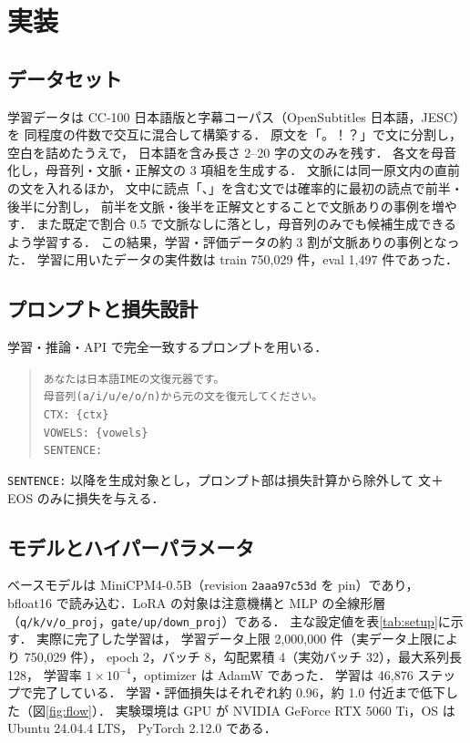 \section{実装}

\subsection{データセット}
学習データは CC-100 日本語版と字幕コーパス（OpenSubtitles 日本語，JESC）を
同程度の件数で交互に混合して構築する．
原文を「。！？」で文に分割し，空白を詰めたうえで，
日本語を含み長さ 2--20 字の文のみを残す．
各文を母音化し，母音列・文脈・正解文の 3 項組を生成する．
文脈には同一原文内の直前の文を入れるほか，
文中に読点「、」を含む文では確率的に最初の読点で前半・後半に分割し，
前半を文脈・後半を正解文とすることで文脈ありの事例を増やす．
また既定で割合 0.5 で文脈なしに落とし，母音列のみでも候補生成できるよう学習する．
この結果，学習・評価データの約 3 割が文脈ありの事例となった．
学習に用いたデータの実件数は train 750{,}029 件，eval 1{,}497 件であった．

\subsection{プロンプトと損失設計}
学習・推論・API で完全一致するプロンプトを用いる．
\begin{quote}\footnotesize
\texttt{あなたは日本語IMEの文復元器です。}\\
\texttt{母音列(a/i/u/e/o/n)から元の文を復元してください。}\\
\texttt{CTX: \{ctx\}}\\
\texttt{VOWELS: \{vowels\}}\\
\texttt{SENTENCE:}
\end{quote}
\texttt{SENTENCE:} 以降を生成対象とし，プロンプト部は損失計算から除外して
文＋EOS のみに損失を与える．

\subsection{モデルとハイパーパラメータ}
ベースモデルは MiniCPM4-0.5B（revision \texttt{2aaa97c53d} を pin）であり，
bfloat16 で読み込む．LoRA の対象は注意機構と MLP の全線形層
（\texttt{q/k/v/o\_proj}，\texttt{gate/up/down\_proj}）である．
主な設定値を表\ref{tab:setup}に示す．
実際に完了した学習は，
学習データ上限 2{,}000{,}000 件（実データ上限により 750{,}029 件），
epoch 2，バッチ 8，勾配累積 4（実効バッチ 32），最大系列長 128，
学習率 $1\times10^{-4}$，optimizer は AdamW であった．
学習は 46{,}876 ステップで完了している．
学習・評価損失はそれぞれ約 0.96，約 1.0 付近まで低下した（図\ref{fig:flow}）．
実験環境は GPU が NVIDIA GeForce RTX 5060 Ti，OS は Ubuntu 24.04.4 LTS，
PyTorch 2.12.0 である．

